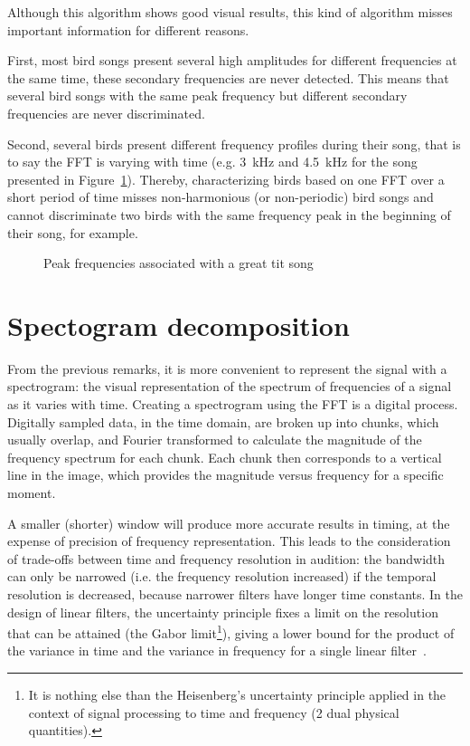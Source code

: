 \documentclass{EPL-master-thesis-covers-EN}
\begin{document}
Although this algorithm shows good visual results, this kind of algorithm misses important information for different reasons.

First, most bird songs present several high amplitudes for different frequencies at the same time, these secondary frequencies are never detected. This means that several bird songs with the same peak frequency but different secondary frequencies are never discriminated.

Second, several birds present different frequency profiles during their song, that is to say the FFT is varying with time (e.g. \SI{3}{kHz} and \SI{4.5}{kHz} for the song presented in Figure~\ref{fig:peak_frequency}). Thereby, characterizing birds based on one FFT over a short period of time misses non-harmonious (or non-periodic) bird songs and cannot discriminate two birds with the same frequency peak in the beginning of their song, for example.

\begin{figure}[H]
    \centering
    
    \caption{Peak frequencies associated with a great tit song}
    \label{fig:peak_frequency}
\end{figure}


\section{Spectogram decomposition}

From the previous remarks, it is more convenient to represent the signal with a spectrogram: the visual representation of the spectrum of frequencies of a signal as it varies with time. Creating a spectrogram using the FFT is a digital process. Digitally sampled data, in the time domain, are broken up into chunks, which usually overlap, and Fourier transformed to calculate the magnitude of the frequency spectrum for each chunk. Each chunk then corresponds to a vertical line in the image, which provides the magnitude versus frequency for a specific moment.

A smaller (shorter) window will produce more accurate results in timing, at the expense of precision of frequency representation.
This leads to the consideration of trade-offs between time
and frequency resolution in audition: the bandwidth can only be narrowed (i.e. the frequency resolution increased) if the temporal resolution is decreased, because narrower filters have longer time constants.
In the design of linear filters, the uncertainty principle fixes a
limit on the resolution that can be attained (the Gabor limit\footnote{It is nothing else than the Heisenberg's uncertainty principle applied in the context of signal processing to time and frequency (2 dual physical quantities).}),
giving a lower bound for the product of the variance in time
and the variance in frequency for a single linear filter~\cite{Stowell}.
\end{document}
